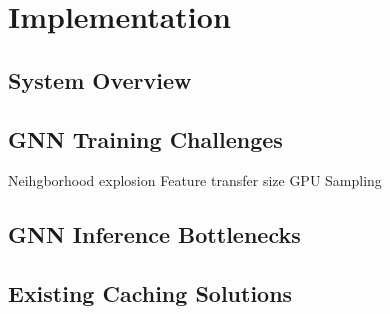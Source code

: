 \chapter{Implementation}

\section{System Overview}

\section{GNN Training Challenges}
Neihgborhood explosion
Feature transfer size
GPU Sampling


\section{GNN Inference Bottlenecks}

\section{Existing Caching Solutions}

